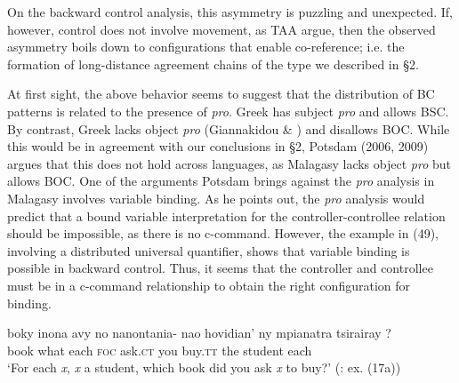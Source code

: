 \documentclass[output=paper]{langsci/langscibook}
\begin{document}
\ea%
    \label{ex:alexiadou:48}
    \z
\z
 
On the backward control analysis, this asymmetry is puzzling and unexpected. If, however, control does not involve movement, as TAA argue, then the observed asymmetry boils down to configurations that enable co-reference; i.e. the formation of long-distance agreement chains of the type we described in §2. 

At first sight, the above behavior seems to suggest that the distribution of BC patterns is related to the presence of \textit{pro}. Greek has subject \textit{pro} and allows BSC. By contrast, Greek lacks object \textit{pro} (Giannakidou \& \citealt{Merchant1997}) and disallows BOC. While this would be in agreement with our conclusions in §2, Potsdam (2006, 2009) argues that this does not hold across languages, as Malagasy lacks object \textit{pro} but allows BOC. One of the arguments Potsdam brings against the \textit{pro} analysis in Malagasy involves variable binding. As he points out, the \textit{pro} analysis would predict that a bound variable interpretation for the controller-controllee relation should be impossible, as there is no c-command. However, the example in (49), involving a distributed universal quantifier, shows that variable binding is possible in backward control. Thus, it seems that the controller and controllee must be in a c-command relationship to obtain the right configuration for binding. 

\ea%
    \label{ex:alexiadou:49}
    \gll boky inona avy no nanontania- nao hovidian’ ny mpianatra tsirairay ?\\
         book what each \textsc{foc}  ask.\textsc{ct}  you buy.\textsc{tt} the student each\\
    \glt ‘For each \textit{x}, \textit{x} a student, which book did you ask \textit{x} to buy?’ (\citealt{Potsdam2006}: ex. (17a))
    \z
\end{document}
